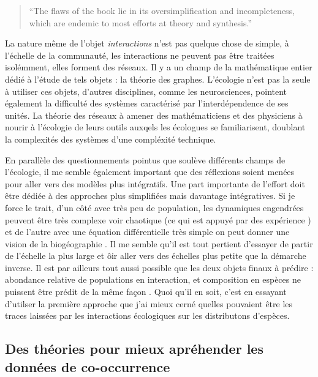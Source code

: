 \begin{quote}
``The flaws of the book lie in its oversimplification and
incompleteness, which are endemic to most efforts at theory and
synthesis.''
\end{quote}

La nature même de l'objet \emph{interactions} n'est pas quelque chose de
simple, à l'échelle de la communauté, les interactions ne peuvent pas
être traitées isolémment, elles forment des réseaux. Il y a un champ de
la mathématique entier dédié à l'étude de tels objets : la théorie des
graphes. L'écologie n'est pas la seule à utiliser ces objets, d'autres
disciplines, comme les neurosciences, pointent également la difficulté
des systèmes caractérisé par l'interdépendence de ses unités. La théorie
des réseaux à amener des mathématiciens et des physiciens à nourir à
l'écologie de leurs outils auxqels les écologues se familiarisent,
doublant la complexités des systèmes d'une compléxité technique.

En parallèle des questionnements pointus que soulève différents champs
de l'écologie, il me semble également important que des réflexions
soient menées pour aller vers des modèles plus intégratifs. Une part
importante de l'effort doit être dédiée à des approches plus simplifiées
mais davantage intégratives. Si je force le trait, d'un côté avec très
peu de population, les dynamiques engendrées peuvent être très complexe
voir chaotique (ce qui est appuyé par des expérience
\citep{Costantino1997b, Fussmann2000}) et de l'autre avec une équation
différentielle très simple on peut donner une vision de la biogéographie
\citep{MacArthur1967}. Il me semble qu'il est tout pertient d'essayer de
partir de l'échelle la plus large et ôir aller vers des échelles plus
petite que la démarche inverse. Il est par ailleurs tout aussi possible
que les deux objets finaux à prédire : abondance relative de populations
en interaction, et composition en espèces ne puissent être prédit de la
même façon \citep[ce qui serait une forme de \emph{rupture de
symétrie}][]{Anderson1972}. Quoi qu'il en soit, c'est en essayant
d'utilser la première approche que j'ai mieux cerné quelles pouvaient
être les traces laissées par les interactions écologiques sur les
distributons d'espèces.

\subsection*{Des théories pour mieux apréhender les données de
co-occurrence}\label{des-thuxe9ories-pour-mieux-apruxe9hender-les-donnuxe9es-de-co-occurrence}

